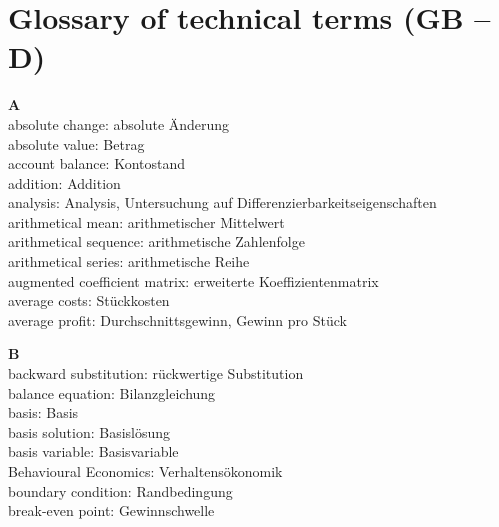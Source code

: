 \appendix
\chapter[Glossary of technical terms (GB -- D)]{Glossary of 
technical terms (GB -- D)}

\noindent
{\bf A}\\
absolute change: absolute \"Anderung\\
absolute value: Betrag\\
account balance: Kontostand\\
addition: Addition\\
analysis: Analysis, Untersuchung auf 
Differenzierbarkeitseigenschaften\\
arithmetical mean: arithmetischer Mittelwert\\
arithmetical sequence: arithmetische Zahlenfolge\\
arithmetical series: arithmetische Reihe\\
augmented coefficient matrix: erweiterte Koeffizientenmatrix\\
average costs: St\"uckkosten\\
average profit: Durchschnittsgewinn, Gewinn pro St\"uck

\medskip
\noindent
{\bf B}\\
backward substitution: r\"uckwertige Substitution\\
balance equation: Bilanzgleichung\\
basis: Basis\\
basis solution: Basisl\"osung\\
basis variable: Basisvariable\\
Behavioural Economics: Verhaltens\"{o}konomik\\
boundary condition: Randbedingung\\
break-even point: Gewinnschwelle

